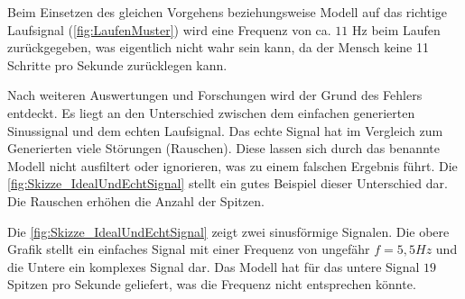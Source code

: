 Beim Einsetzen des gleichen Vorgehens beziehungsweise Modell auf das richtige Laufsignal (\autoref{fig:LaufenMuster}) wird eine Frequenz von ca. $11$ Hz beim Laufen zurückgegeben, was eigentlich nicht wahr sein kann, da der Mensch keine 11 Schritte pro Sekunde zurücklegen kann.

Nach weiteren Auswertungen und Forschungen wird der Grund des Fehlers entdeckt. Es liegt an den Unterschied zwischen dem einfachen generierten Sinussignal und dem echten Laufsignal. Das echte Signal hat im Vergleich zum Generierten viele Störungen (Rauschen). Diese lassen sich durch das benannte Modell nicht ausfiltert oder ignorieren, was zu einem falschen Ergebnis führt. Die \autoref{fig:Skizze_IdealUndEchtSignal} stellt ein gutes Beispiel dieser Unterschied dar. Die Rauschen erhöhen die Anzahl der Spitzen.

Die \autoref{fig:Skizze_IdealUndEchtSignal} zeigt zwei sinusförmige Signalen. Die obere Grafik stellt ein einfaches Signal mit einer Frequenz von ungefähr $f = 5,5 Hz$ und die Untere ein komplexes Signal dar.
Das Modell hat für das untere Signal $19$ Spitzen pro Sekunde geliefert, was die Frequenz nicht entsprechen könnte.

